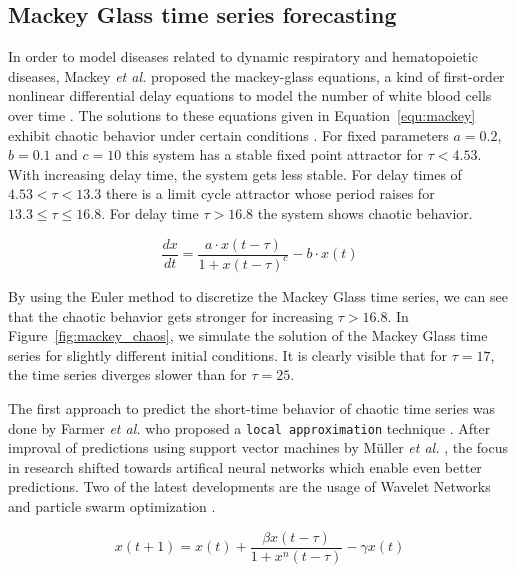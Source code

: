 \documentclass{article}
\begin{document}
\subsection{Mackey Glass time series forecasting}

In order to model diseases related to dynamic respiratory and hematopoietic
diseases, Mackey \textit{et al.} proposed the mackey-glass equations, a kind of
first-order nonlinear differential delay equations to model
the number of white blood cells over time \cite{mackey1977}. The solutions to
these equations given in Equation~\ref{equ:mackey}
exhibit chaotic behavior under certain conditions \cite{farmer1982}. For fixed
parameters $a = 0.2$, $b=0.1$ and $c=10$ this system has a stable fixed point
attractor for $\tau < 4.53$. With increasing delay time, the system gets less
stable. For delay times of $4.53 < \tau < 13.3$ there is a limit cycle attractor
whose period raises for $13.3 \leq \tau \leq 16.8$. For delay time
$\tau > 16.8$ the system shows chaotic behavior.

\begin{equation}
  \frac{dx}{dt} = \frac{a \cdot x(t - \tau)}{1 + x(t - \tau)^c} - b \cdot x(t)
  \label{equ:mackey}
\end{equation}

By using the Euler method to discretize the Mackey Glass time series, we can
see that the chaotic behavior gets stronger for increasing $\tau > 16.8$. In
Figure~\ref{fig:mackey_chaos}, we simulate the solution of the Mackey Glass
time series for slightly different initial conditions. It is clearly visible
that for $\tau = 17$, the time series diverges slower than for $\tau = 25$.

The first approach to predict the short-time behavior of chaotic time series
was done by Farmer \textit{et al.} who proposed a \texttt{local approximation}
technique \cite{farmer1987}. After improval of predictions using support vector
machines by Müller \textit{et al.} \cite{muller1997}, the focus in research
shifted towards artifical neural networks which enable even better predictions.
Two of the latest developments are the usage of Wavelet Networks
\cite{alexandridis2013} and particle swarm optimization \cite{caraballo2016}.

\begin{equation}
  x(t+1) = x(t) + \frac{\beta x(t - \tau)}{1 + x^{n}(t - \tau)} - \gamma x(t)
  \label{equ:mackey_euler}
\end{equation}
\end{document}
